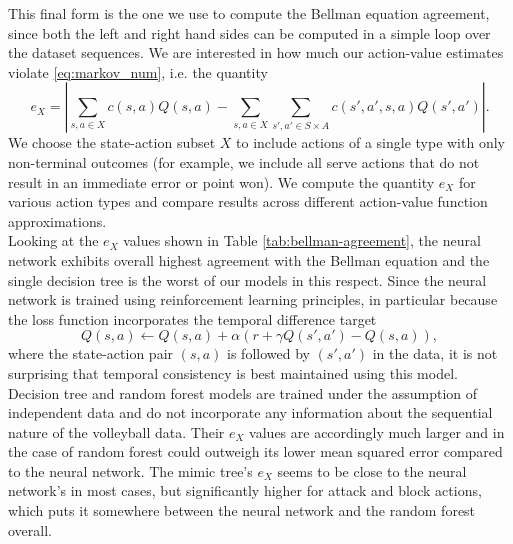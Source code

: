 \documentclass{sfuthesis}
\begin{document}
	This final form is the one we use to compute the Bellman equation agreement, since both the left and right hand sides can be computed in a simple loop over the dataset sequences. We are interested in how much our action-value estimates violate \eqref{eq:markov_num}, i.e. the quantity
	\begin{equation}
		e_X = |\sum_{s,a\in X} c(s,a)Q(s,a) - \sum_{s,a\in X} \sum_{s',a'\in S\times A} c(s',a',s,a) Q(s',a') |.
		\label{eq:markov_num2}
	\end{equation}
	We choose the state-action subset $X$ to include actions of a single type with only non-terminal outcomes (for example, we include all serve actions that do not result in an immediate error or point won). We compute the quantity $e_X$ for various action types and compare results across different action-value function approximations.\\
	Looking at the $e_X$ values shown in Table \ref{tab:bellman-agreement}, the neural network exhibits overall highest agreement with the Bellman equation and the single decision tree is the worst of our models in this respect. Since the neural network is trained using reinforcement learning principles, in particular because the loss function incorporates the temporal difference target 
	$$Q(s,a) \leftarrow Q(s,a) + \alpha (r + \gamma Q(s', a') - Q(s,a)),$$
	where the state-action pair $(s,a)$ is followed by $(s',a')$ in the data, it is not surprising that temporal consistency is best maintained using this model. Decision tree and random forest models are trained under the assumption of independent data and do not incorporate any information about the sequential nature of the volleyball data. Their $e_X$ values are accordingly much larger and in the case of random forest could outweigh its lower mean squared error compared to the neural network. The mimic tree's $e_X$ seems to be close to the neural network's in most cases, but significantly higher for attack and block actions, which puts it somewhere between the neural network and the random forest overall.
	
\end{document}
